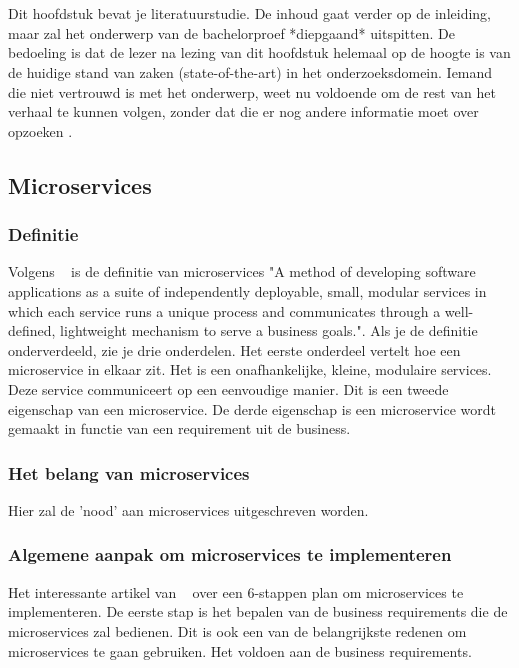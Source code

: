 \chapter{}
\label{ch:stand-van-zaken}



Dit hoofdstuk bevat je literatuurstudie. De inhoud gaat verder op de inleiding, maar zal het onderwerp van de bachelorproef *diepgaand* uitspitten. De bedoeling is dat de lezer na lezing van dit hoofdstuk helemaal op de hoogte is van de huidige stand van zaken (state-of-the-art) in het onderzoeksdomein. Iemand die niet vertrouwd is met het onderwerp, weet nu voldoende om de rest van het verhaal te kunnen volgen, zonder dat die er nog andere informatie moet over opzoeken \autocite{Pollefliet2011}.

\section{Microservices}
\subsection{Definitie}
Volgens ~\cite{Mauersberger2017} is de definitie van microservices "A method of developing software applications as a suite of independently deployable, small, modular services in which each service runs a unique process and communicates through a well-defined, lightweight mechanism to serve a business goals.". Als je de definitie onderverdeeld, zie je drie onderdelen. Het eerste onderdeel vertelt hoe een microservice in elkaar zit. Het is een onafhankelijke, kleine, modulaire services. Deze service communiceert op een eenvoudige manier. Dit is een tweede eigenschap van een microservice. De derde eigenschap is een microservice wordt gemaakt in functie van een requirement uit de business. 
\subsection{Het belang van microservices}
Hier zal de 'nood' aan microservices uitgeschreven worden.
\subsection{Algemene aanpak om microservices te implementeren}
Het interessante artikel van ~\cite{Benetis2016} over een 6-stappen plan om microservices te implementeren.
De eerste stap is het bepalen van de business requirements die de microservices zal bedienen. Dit is ook een van de belangrijkste redenen om microservices te gaan gebruiken. Het voldoen aan de business requirements. 
